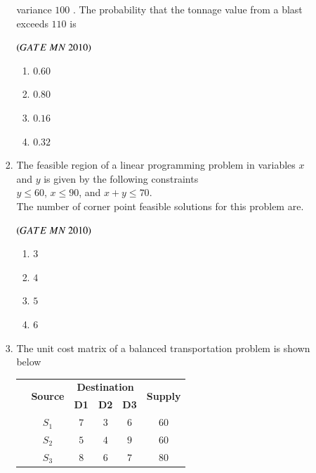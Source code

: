 \documentclass{article}
\begin{document}
\begin{enumerate}[label=Q.\arabic*., itemsep=1em, leftmargin=0pt, itemindent=*, labelsep=0.5em]
\begin{enumerate}[label=Q.\arabic*., start=17, leftmargin=2em]
\begin{enumerate}[label=Q.\arabic*., start=33, leftmargin=2em]
variance $100$ . The probability that the tonnage value from a blast exceeds $110$ is
\\
\begin{flushright}
\hfill$\left(GATE\ MN\ 2010\right)$
\end{flushright}
\begin{multicols}{4}
\begin{enumerate}[label=(\Alph*), leftmargin=4em]
\item $0.60 $
\item $0.80$
\item $0.16$
\item $0.32$
\end{enumerate}
\end{multicols}
\bigskip
\item The feasible region of a linear programming problem in variables $x$ and $y$ is given by the following constraints  \\
$y \leq 60$, $x \leq 90$, and $x + y \leq 70$.\\
The number of corner point feasible solutions for this problem are.
\
\begin{flushright}
\hfill$\left(GATE\ MN\ 2010\right)$
\end{flushright}
\begin{multicols}{4}
\begin{enumerate}[label=(\Alph*), leftmargin=4em]
\item $3$
\item $4$
\item $5$
\item $6$
\end{enumerate}
\end{multicols}
\bigskip
\item The unit cost matrix of a balanced transportation problem is shown below
\begin{table}[h!]
\centering
\begin{tabular}{|c|c|c|c|c|c|}
\hline
\multirow{2}{*}{\textbf{}} & \multirow{2}{*}{\textbf{Source}} & \multicolumn{3}{c|}{\textbf{Destination}} & \multirow{2}{*}{\textbf{Supply}} \\
\cline{3-5}
 & & \textbf{D1} & \textbf{D2} & \textbf{D3} & \\
\hline
 & $S_1$ & $7$ & $3$ & $6$ & $60$ \\
\hline
 & $S_2$ & $5$ & $4$ & $9$ & $60$ \\
\hline
 & $S_3$ & $8$ & $6$ & $7$ & $80$ \\

\end{tabular}
\end{table}
\end{enumerate}
\end{enumerate}
\end{enumerate}
\end{document}
